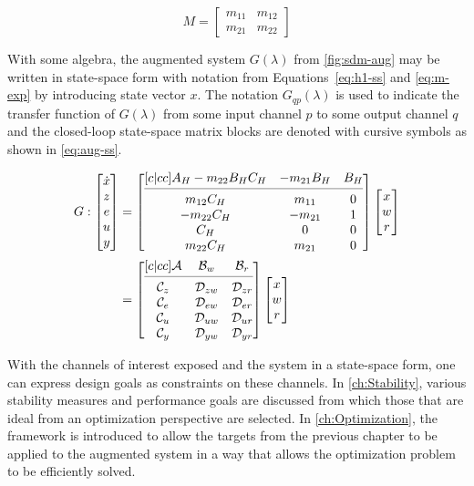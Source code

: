 \begin{equation}
	M = 
	\begin{bmatrix}
		m_{11} & m_{12} \\
		m_{21} & m_{22}
	\end{bmatrix} \label{eq:m-exp}
\end{equation}

With some algebra, the augmented system $G(\lambda)$ from \autoref{fig:sdm-aug} may be written in state-space form with notation from Equations~\ref{eq:h1-ss} and \ref{eq:m-exp} by introducing state vector $x$. The notation $G_{qp}(\lambda)$ is used to indicate the transfer function of $G(\lambda)$ from some input channel $p$ to some output channel $q$ and the closed-loop state-space matrix blocks are denoted with cursive symbols as shown in \autoref{eq:aug-ss}.

\begin{align}
	G:
	\begin{bmatrix}
		\dot{x} \\
		z \\
		e \\
		u \\
		y
	\end{bmatrix} &=
	\begin{bmatrix}[c|cc]
		A_H - m_{22}B_HC_H & -m_{21}B_H & B_H \\
		\cmidrule(lr){1-3}
		m_{12}C_H & m_{11} & 0 \\
		-m_{22}C_H & -m_{21} & 1 \\
		C_H & 0 & 0 \\
		m_{22}C_H & m_{21} & 0
	\end{bmatrix}
	\begin{bmatrix}
		x \\
		w \\
		r
	\end{bmatrix} \label{eq:aug} \\
	&=
	\begin{bmatrix}[c|cc]
		\mathcal{A} & \mathcal{B}_w & \mathcal{B}_r \\
		\cmidrule(lr){1-3}
		\mathcal{C}_z & \mathcal{D}_{zw} & \mathcal{D}_{zr} \\
		\mathcal{C}_e & \mathcal{D}_{ew} & \mathcal{D}_{er} \\
		\mathcal{C}_u & \mathcal{D}_{uw} & \mathcal{D}_{ur} \\
		\mathcal{C}_y & \mathcal{D}_{yw} & \mathcal{D}_{yr}
	\end{bmatrix}
	\begin{bmatrix}
		x \\
		w \\
		r
	\end{bmatrix} \label{eq:aug-ss}
\end{align}

With the channels of interest exposed and the system in a state-space form, one can express design goals as constraints on these channels. In \autoref{ch:Stability}, various stability measures and performance goals are discussed from which those that are ideal from an optimization perspective are selected. In \autoref{ch:Optimization}, the framework is introduced to allow the targets from the previous chapter to be applied to the augmented system in a way that allows the optimization problem to be efficiently solved.